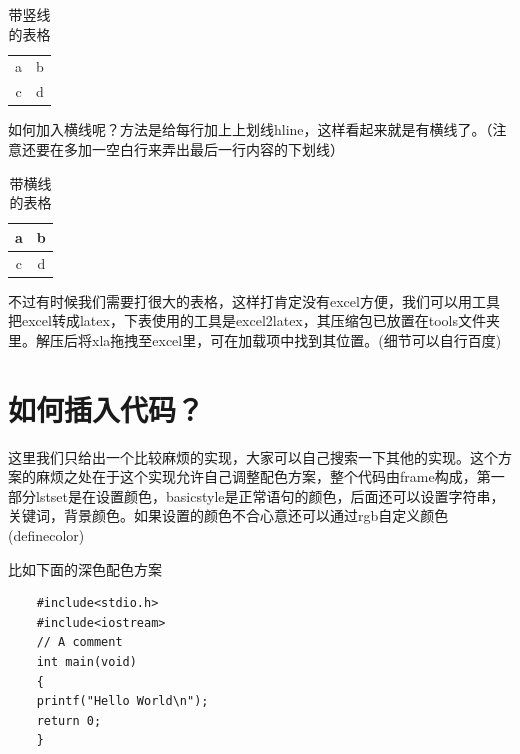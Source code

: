 \documentclass[twoside]{ctexart}
\begin{document}
    \begin{table}[H] %
        \centering %
        \begin{tabular}{|c|c|} 
        
        a  & b \\ 
        c  & d
        \end{tabular}
        \caption{带竖线的表格}
        \label{tab:my_label}
    \end{table}
    
    如何加入横线呢？方法是给每行加上上划线hline，这样看起来就是有横线了。（注意还要在多加一空白行来弄出最后一行内容的下划线）
    
    \begin{table}[H] %
        \centering %
        \begin{tabular}{|c|c|} 
        \hline
        a  & b \\ 
        \hline
        c  & d \\
        \hline
        \end{tabular}
        \caption{带横线的表格}
        \label{tab:my_label}
    \end{table}
    
    不过有时候我们需要打很大的表格，这样打肯定没有excel方便，我们可以用工具把excel转成latex，下表使用的工具是excel2latex，其压缩包已放置在tools文件夹里。解压后将xla拖拽至excel里，可在加载项中找到其位置。(细节可以自行百度)

    
    \section{如何插入代码？}
    这里我们只给出一个比较麻烦的实现，大家可以自己搜索一下其他的实现。这个方案的麻烦之处在于这个实现允许自己调整配色方案，整个代码由frame构成，第一部分lstset是在设置颜色，basicstyle是正常语句的颜色，后面还可以设置字符串，关键词，背景颜色。如果设置的颜色不合心意还可以通过rgb自定义颜色(definecolor)
    
    比如下面的深色配色方案
\begin{frame}


\begin{lstlisting}
    #include<stdio.h>
    #include<iostream>
    // A comment
    int main(void)
    {
    printf("Hello World\n");
    return 0;
    }
\end{lstlisting}

\end{frame}
\end{document}
